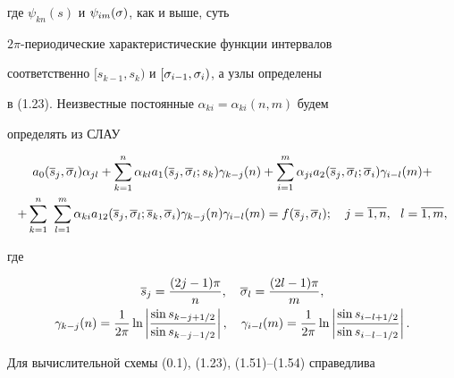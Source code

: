 где $\psi_{kn}(s)$ и $\psi_{im}(\sigma)$, как и выше, суть 


$2\pi$-периодические характеристические функции интервалов 


соответственно $[s_{k-1},s_k)$ и $[\sigma_{i-1},\sigma_i)$, а узлы определены 


в (1.23). Неизвестные постоянные $\alpha_{ki} = \alpha_{ki}(n,m)$ будем 


определять из СЛАУ


\begin{multline}


a_0(\ol{s}_j,\ol{\si}_l)\alpha_{jl}+\sum_{k=1}^n \alpha_{kl}


a_1(\ol{s}_j,\ol{\si}_l;s_k)


\gamma_{k-j}{(n)}+\sum_{i=1}^m\alpha_{ji}a_2


(\ol{s}_j,\ol{\si}_l;\ol{\si}_i)\gamma_{i-l}{(m)}+ \\


%


+ \sum_{k=1}^n\ \sum_{l=1}^m\alpha_{ki}a_{12}(\ol{s}_j,


\ol{\si}_l;\ol{s}_k,\ol{\si}_i)\gamma_{k-j}{(n)}\gamma_{i-l}{(m)}=


f(\ol{s}_j,\ol{\si}_l);\quad j=\ol{1,n},\ \ l=\ol{1,m},


\end{multline}


где 


\begin{gather}


\ol{s}_j = \frac{(2j-1)\pi}{n},\quad \ol{\sigma}_l = \frac{(2l-1)\pi}{m}, \\


%


\gamma_{k-j}(n) = \frac{1}{2\pi}\ln \left|


\frac{\sin s_{k-j+1/2}}{\sin s_{k-j-1/2}}\right|,


\quad \gamma_{i-l}(m) = \frac{1}{2\pi}\ln


\left|\frac{\sin s_{i-l+1/2}}{\sin s_{i-l-1/2}}\right|.


\end{gather}





Для вычислительной схемы (0.1), (1.23), (1.51)--(1.54) справедлива 






